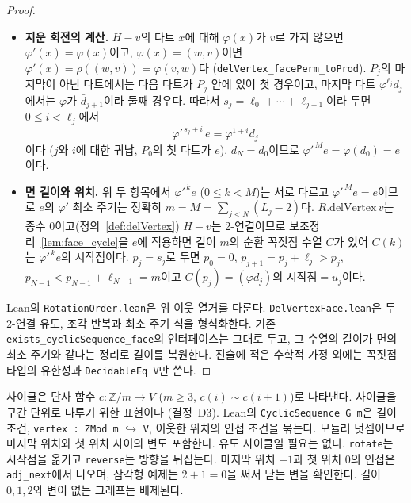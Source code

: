 \begin{proof}
\begin{itemize}
        최소 주기 아래의 반복이라 서로 다르다. 따라서 \(M = \ell_0 + \cdots + \ell_{N-1}\)개의 다트가 모두 다르다.
  \item \textbf{지운 회전의 계산.} \(H - v\)의 다트 \(x\)에 대해 \(\varphi(x)\)가 \(v\)로 가지 않으면
        \(\varphi'(x) = \varphi(x)\)이고, \(\varphi(x) = (w, v)\)이면 \(\varphi'(x) = \rho((w, v)) = \varphi(v, w)\)다
        (\texttt{delVertex\_facePerm\_toProd}). \(P_j\)의 마지막이 아닌 다트에서는 다음 다트가 \(P_j\) 안에 있어
        첫 경우이고, 마지막 다트 \(\varphi^{\ell_j} d_j\)에서는 \(\varphi\)가 \(\bar d_{j+1}\)이라 둘째 경우다.
        따라서 \(s_j = \ell_0 + \cdots + \ell_{j-1}\)이라 두면 \(0 \le i < \ell_j\)에서
        \[
          \varphi'^{\,s_j + i}\, e = \varphi^{1 + i} d_j
        \]
        이다 (\(j\)와 \(i\)에 대한 귀납, \(P_0\)의 첫 다트가 \(e\)). \(d_N = d_0\)이므로
        \(\varphi'^{\,M} e = \varphi(d_0) = e\)이다.
  \item \textbf{면 길이와 위치.} 위 두 항목에서 \(\varphi'^{\,k} e\) (\(0 \le k < M\))는 서로 다르고
        \(\varphi'^{\,M} e = e\)이므로 \(e\)의 \(\varphi'\) 최소 주기는 정확히 \(m = M = \sum_{j<N} (L_j - 2)\)다.
        \(R.\mathrm{delVertex}\,v\)는 종수 0이고(정의~\ref{def:delVertex}) \(H - v\)는 2-연결이므로
        보조정리~\ref{lem:face_cycle}을 \(e\)에 적용하면 길이 \(m\)의 순환 꼭짓점 수열 \(C\)가 있어
        \(C(k)\)는 \(\varphi'^{\,k} e\)의 시작점이다. \(p_j = s_j\)로 두면 \(p_0 = 0\),
        \(p_{j+1} = p_j + \ell_j > p_j\), \(p_{N-1} < p_{N-1} + \ell_{N-1} = m\)이고
        \(C(p_j) = (\varphi d_j)\text{의 시작점} = u_j\)이다.
\end{itemize}
Lean의 \texttt{RotationOrder.lean}은 위 이웃 열거를 다룬다.
\texttt{DelVertexFace.lean}은 두 2-연결 유도, 조각 반복과 최소 주기 식을
형식화한다. 기존 \texttt{exists\_cyclicSequence\_face}의 인터페이스는 그대로 두고, 그 수열의 길이가
면의 최소 주기와 같다는 정리로 길이를 복원한다. 진술에 적은 수학적 가정 외에는
꼭짓점 타입의 유한성과 \texttt{DecidableEq V}만 쓴다.
\end{proof}


\begin{definition}[순환 꼭짓점 수열]
\label{def:cycseq}
\leanok
사이클은 단사 함수 \(c : \mathbb{Z}/m \to V\) (\(m \ge 3\), \(c(i) \sim c(i + 1)\))로 나타낸다. 사이클을
구간 단위로 다루기 위한 표현이다 (결정~D3). Lean의 \texttt{CyclicSequence G m}은 길이 조건,
\texttt{vertex : ZMod m} \(\hookrightarrow\) \texttt{V}, 이웃한 위치의 인접 조건을 묶는다.
모듈러 덧셈이므로 마지막 위치와 첫 위치 사이의 변도 포함한다. 유도 사이클일 필요는 없다.
\texttt{rotate}는 시작점을 옮기고 \texttt{reverse}는 방향을 뒤집는다. 마지막 위치 \(-1\)과 첫 위치
\(0\)의 인접은 \texttt{adj\_next}에서 나오며, 삼각형 예제는 \(2 + 1 = 0\)을 써서 닫는 변을 확인한다.
길이 \(0,1,2\)와 변이 없는 그래프는 배제된다.
\end{definition}

